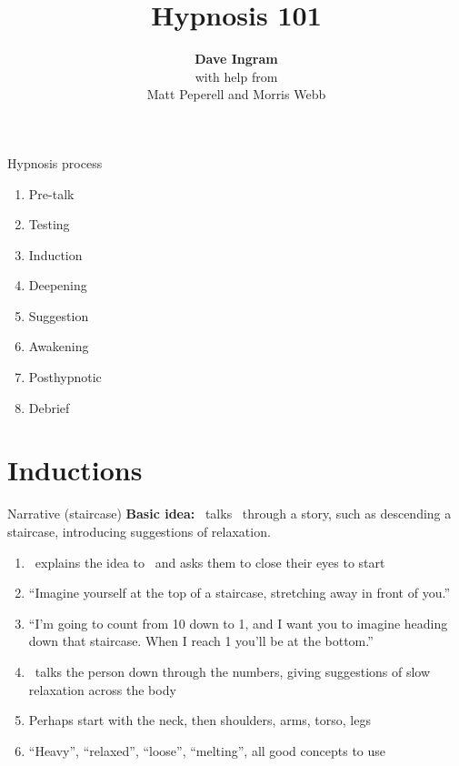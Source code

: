 \documentclass[style=mindhack]{powerdot}
\title{Hypnosis 101}
\author{\textbf{Dave Ingram}\vspace*{3pt}\\\footnotesize with help from\vspace*{3pt}\\\small Matt Peperell and Morris Webb}
\newcommand\hypS{\pscirclebox[linecolor=blue!40!black,framesep=.5pt]{\textcolor{blue!40!black}{\textbf{S}}}}
\newcommand\hypH{\psframebox[linecolor=green!60!black,framesep=1.5pt]{\textcolor{green!60!black}{\textbf{H}}}}
\newcommand\hl[2]{{\onslide*{#1}{\bfseries\color{red}}#2}}
\begin{document}
	\maketitle

  \begin{slide}{Hypnosis process}%
    \begin{center}
      \begin{minipage}{.35\linewidth}
        \Large
        \begin{enumerate}
          \item Pre-talk
          \item Testing
          \item \hl{2}{Induction}
          \item \hl{2}{Deepening}
          \item \hl{2}{Suggestion}
          \item \hl{2}{Awakening}
          \item \hl{2}{Posthypnotic}
          \item Debrief
        \end{enumerate}
      \end{minipage}
    \end{center}
  \end{slide}

  \section{Inductions}

  \begin{slide}{Narrative (staircase)}
    \textbf{Basic idea:} \hypH\ talks \hypS\ through a story, such as
    descending a staircase, introducing suggestions of relaxation.

    \begin{enumerate}
      \item \hypH\ explains the idea to \hypS\ and asks them to close their eyes to start
      \item ``Imagine yourself at the top of a staircase, stretching away in front of you.''
      \item ``I'm going to count from 10 down to 1, and I want you to imagine heading down that staircase. When I reach 1 you'll be at the bottom.''
      \item \hypH\ talks the person down through the numbers, giving suggestions of slow relaxation across the body
      \item Perhaps start with the neck, then shoulders, arms, torso, legs
      \item ``Heavy'', ``relaxed'', ``loose'', ``melting'', all good concepts to use
    \end{enumerate}
  \end{slide}
\end{document}
